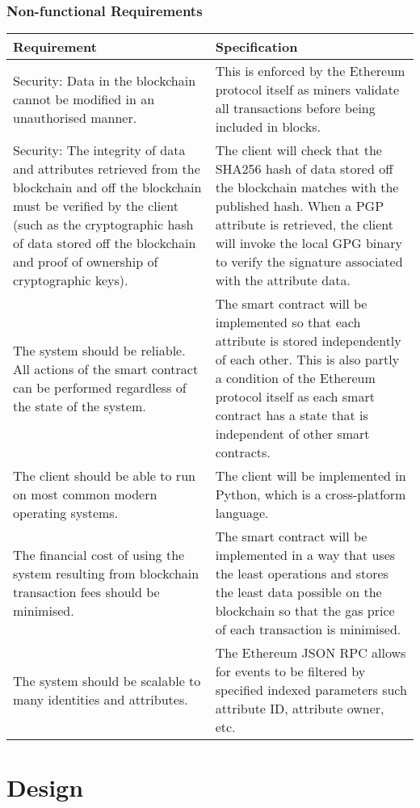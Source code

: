 \documentclass[12pt,a4paper]{report}
\begin{document}
	\subsection{Non-functional Requirements}	
	\begin{longtable}{|p{5.5cm}|p{5.5cm}|}
		\hline
		\textbf{Requirement} & \textbf{Specification} \\ \hline
		Security: Data in the blockchain cannot be modified in an unauthorised manner. & This is enforced by the Ethereum protocol itself as miners validate all transactions before being included in blocks. \\ \hline
		Security: The integrity of data and attributes retrieved from the blockchain and off the blockchain must be verified by the client (such as the cryptographic hash of data stored off the blockchain and proof of ownership of cryptographic keys). & The client will check that the SHA256 hash of data stored off the blockchain matches with the published hash. When a PGP attribute is retrieved, the client will invoke the local GPG binary to verify the signature associated with the attribute data. \\ \hline
		The system should be reliable. All actions of the smart contract can be performed regardless of the state of the system. & The smart contract will be implemented so that each attribute is stored independently of each other. This is also partly a condition of the Ethereum protocol itself as each smart contract has a state that is independent of other smart contracts. \\ \hline
		The client should be able to run on most common modern operating systems. & The client will be implemented in Python, which is a cross-platform language. \\ \hline
		The financial cost of using the system resulting from blockchain transaction fees should be minimised. & The smart contract will be implemented in a way that uses the least operations and stores the least data possible on the blockchain so that the gas price of each transaction is minimised. \\ \hline
		The system should be scalable to many identities and attributes. & The Ethereum JSON RPC allows for events to be filtered by specified indexed parameters such attribute ID, attribute owner, etc. \\ \hline
	\end{longtable}
	
	\chapter{Design}
\end{document}
